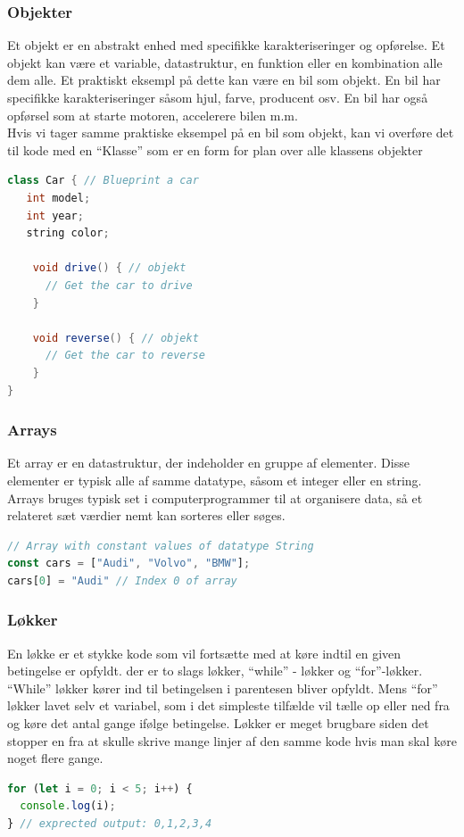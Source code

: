 \documentclass[12pt]{article}
\begin{document}
\subsubsection{Objekter}
Et objekt er en abstrakt enhed med specifikke karakteriseringer og opførelse. Et objekt kan være et variable, datastruktur, en funktion eller en kombination alle dem alle. Et praktiskt eksempl på dette kan være en bil som objekt. En bil har specifikke karakteriseringer såsom hjul, farve, producent osv. En bil har også opførsel som at starte motoren, accelerere bilen m.m. 
\\Hvis vi tager samme praktiske eksempel på en bil som objekt, kan vi overføre det til kode med en “Klasse” som er en form for plan over alle klassens objekter
\begin{lstlisting}[language=Java, caption=Eksempel på et objekt]
  class Car { // Blueprint a car
   int model;
   int year;
   string color;
   
    void drive() { // objekt
      // Get the car to drive
    }

    void reverse() { // objekt
      // Get the car to reverse
    }
}
\end{lstlisting}
\subsubsection{Arrays}
Et array er en datastruktur, der indeholder en gruppe af elementer. Disse elementer er typisk alle af samme datatype, såsom et integer eller en string. Arrays bruges typisk set i computerprogrammer til at organisere data, så et relateret sæt værdier nemt kan sorteres eller søges.
\begin{lstlisting}[language=JavaScript, caption=Eksempel på et array]
// Array with constant values of datatype String
const cars = ["Audi", "Volvo", "BMW"];
cars[0] = "Audi" // Index 0 of array
\end{lstlisting}

\subsubsection{Løkker}
En løkke er et stykke kode som vil fortsætte med at køre indtil en given betingelse er opfyldt. der er to slags løkker, “while” - løkker og “for”-løkker. “While” løkker kører ind til betingelsen i parentesen bliver opfyldt. Mens “for” løkker lavet selv et variabel, som i det simpleste tilfælde vil tælle op eller ned fra og køre det antal gange ifølge betingelse. Løkker er meget brugbare siden det stopper en fra at skulle skrive mange linjer af den samme kode hvis man skal køre noget flere gange.
\begin{lstlisting}[language=JavaScript, caption=Eksempel på et for løkke]
for (let i = 0; i < 5; i++) {
  console.log(i);
} // exprected output: 0,1,2,3,4
\end{lstlisting}
\end{document}
